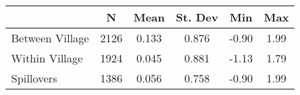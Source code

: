 \begin{tabular}{l*{5}{c}}\hline&\multicolumn{1}{c}{N}&\multicolumn{1}{c}{Mean}&\multicolumn{1}{c}{St. Dev}&\multicolumn{1}{c}{Min}&\multicolumn{1}{c}{Max}\\ \hline 
Between Village & 2126 & 0.133 & 0.876 & -0.90 & 1.99 \\
Within Village & 1924 & 0.045 & 0.881 & -1.13 & 1.79 \\
Spillovers & 1386 & 0.056 & 0.758 & -0.90 & 1.99 \\
\hline \end{tabular}
